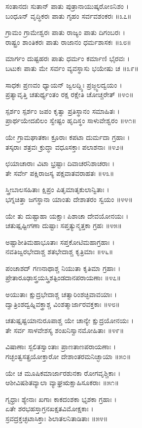 ಸಂತಾನದಃ ಸುತಾನ್ ಪಾತು ಪುತ್ರಾನಾಯುಷ್ಕರೋಽನಿಶಂ ।\\
ಬಂಧೂನ್ ವೃದ್ಧಿಕರಃ ಪಾತು ಗೃಹಂ ಸರ್ವವಶಂಕರಃ ॥೩೭॥

ಗ್ರಾಮಂ ಗ್ರಾಮೇಶ್ವರಃ ಪಾತು ರಾಜ್ಯಂ ಪಾತು ದಿಗಂಬರಃ ।\\
ರಾಷ್ಟ್ರಂ ಶಾಂತಿಕರಃ ಪಾತು ರಾಜಾನಂ ಧರ್ಮಶಾಸಕಃ ॥೩೮॥

ಮಾರ್ಗಂ ದುಷ್ಟಹರಃ ಪಾತು ಧರ್ಮಂ ಕರ್ಮಾಣಿ ಭೈರವಃ ।\\
ಬಟುಕಃ ಪಾತು ಮೇ ಸರ್ವಂ ವ್ಯವಸ್ಥಾಸು ಭಯೇಷು ಚ ॥೩೯॥

ಸಾಧಕಃ ಪ್ರಣವಂ ಧ್ಯಾಯನ್ ಜ್ವಲದ್ದ್ವಿಃ ಪ್ರಜ್ಜ್ವಲದ್ವಯಂ ।\\
ಪ್ರತ್ಯಾವೃತ್ತಿ ಚತುರ್ಥ್ಯಂತಂ ರಕ್ಷ ರಕ್ಷೇತಿ ಚೋಚ್ಚರೇತ್ ॥೪೦॥

ಸ್ಪರ್ಶಂ ಸ್ಪರ್ಶಂ ಜಪಂ ಕೃತ್ವಾ ಪ್ರತಿಸ್ಥಾನಂ ಸಮಾಹಿತಃ ।\\
ಪ್ರಾರ್ಥಯೇದಖಿಲಂ ಸ್ವೇಷ್ಟಂ ಹೃದಿಸ್ಥಂ ಸಾಳುವೇಶ್ವರಂ ॥೪೧॥

ಯೇ ಗ್ರಾಮಘಾತಕಾಃ ಕ್ರೂರಾಃ ಕಪಟಾ ದುರ್ಮದಾ ಗ್ರಹಾಃ ।\\
ತಸ್ಕರಾಃ ಶತ್ರವಃ ಕ್ರುದ್ಧಾ ವಧೂಸಕ್ತಾಃ ಪಲಾಶನಾಃ ॥೪೨॥

ಛಯಾಚಾರಾಃ ವಿಟಾ ಭ್ರಷ್ಟಾಃ ದಿವಾಚರನಿಶಾಚರಾಃ ।\\
ತೇ ಸರ್ವೇ ಪಕ್ಷಿರಾಜಸ್ಯ ಪಕ್ಷವಾತವರಾಹತಃ ॥೪೩॥

ಸ್ತ್ರೀಬಾಲಸಹಿತಾಃ ಕ್ಷಿಪ್ರಂ ಪಿತೃಮಾತೃಕುಲಾನ್ವಿತಾಃ ।\\
ಭಗ್ನಚಿತ್ತಾ ಜಗಸ್ಥಾನಾ ಯಾಂತು ದೇಶಾತರಂ ಸ್ವಯಂ ॥೪೪॥

ಯೇ ತು ದುಷ್ಟಾಹಾ ಯಕ್ಷಾಃ ಪಿಶಾಚಾ ದೇವಯೋನಯಃ ।\\
ಚತುಷ್ಷಷ್ಟೀಗಣಾ ದುಷ್ಟಾಃ ಸಪ್ತತ್ಯುನ್ಮತ್ತಕಾ ಗ್ರಹಃ ॥೪೫॥

ಅಷ್ಟಾಶೀತಿಮಹಾಭೂತಾಃ ಸಪ್ತಕೋಟಿಮಹಾಗ್ರಹಾಃ ।\\
ನವತಿಜ್ವರಭೇದಾಶ್ಚ ಶತಭೇದಾಶ್ಚ ಕೃತ್ರಿಮಾಃ ॥೪೬॥

ಪಂಚಾಶದ್ ಗಣನಾಥಾಶ್ಚ ನಿಯುತಾ ಕೃತಿಮಾ ಗ್ರಹಾಃ ।\\
ಪ್ರೇತಾರೂಢಾಸ್ತ್ರಯಸ್ತ್ರಿಶತ್ಪಿಂಡದಾನಪರಾಯಣಾಃ ॥೪೭॥

ಅಯುತಾಃ ಕ್ಷುದ್ರಭೇದಾಶ್ಚ ಚತ್ವಾರಿಂಶಚ್ಛಿವಾವಯಾಃ ।\\
ದ್ವಾತ್ರಿಂಶದ್ವಹ್ನಿವಕ್ತ್ರಾಶ್ಚ ವಿಂಶತ್ಮಾರ್ಜಾರವಕ್ತಕಾಃ ॥೪೮॥

ಚತುಷ್ಷಷ್ಟಯಾನುರೂಪಾಶ್ಚ ಯೇ ಚಾನ್ಯೇ ಕ್ಷುದ್ರಯೋನಯಃ ।\\
ತೇ ಸರ್ವ ಸಾಳವೇಶಸ್ಯ ಶಂಖನಿಸ್ವಾನಮೋಹಿತಾಃ ॥೪೯॥

ವಿಷಾಣಾಃ ಸ್ಖಲಿತಸ್ವಾಂತಾಃ ಪ್ರಾಣತಾಣಪರಾಯಣಾಃ ।\\
ಗಚ್ಛಂತ್ವಸತ್ಪ್ರಯೋಕ್ತಾರೋ ದೇಶಾಂತರಮನಿಚ್ಛಾಯಾ ॥೫೦॥

ಯೇ ಚ ಮೂಷಿಕಮಾರ್ಜಾರಶುನಕಾ ರೋಗವೃಶ್ಚಿಕಾಃ ।\\
ಆಶೀವಿಷಶಿತವ್ಯಾಲಾ ವ್ಯಾಘ್ರಋಕ್ಷಾಹಿಸೂಕರಾಃ ॥೫೧॥

ಗೃಧ್ರಾಃ ಶ್ಯೇನಾಃ ಖಗಾಃ ಕಾಕದಂಶಕಾ ಭೃಶಕಾ ಗ್ರಹಾಃ ।\\
ಏತೇ ಶರಭಹಸ್ತಾಗ್ರನಖಕ್ಷತವಿಮೋಕ್ಷಕಾಃ ।\\
ಸ್ರವದ್ರಕ್ತಚ್ಛಟಾಸಿಕ್ತಾಃ ಶಿಲಾತಲನಿತಾಡಿತಾಃ ॥೫೪॥

